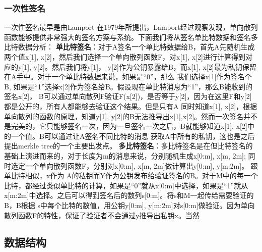 \subsubsection{一次性签名}
一次性签名最早是由Lamport \cite{diffie1976new}在1979年所提出，Lamport经过观察发现，单向散列函数能够提供非常强大的签名方案与系统。下面我们将从签名单比特数据和签名多比特数据分析：
\textbf{单比特签名}：对于A签名一个单比特数据给B，首先A先随机生成两个值x[1], x[2]，然后我们选择一个单向散列函数F，对x[1], x[2]进行计算得到对应的y[1], y[2]。然后我们将y[1]， y[2]作为公钥暴露给B，而x[1], x[2]最为私钥保留在A手中。对于一个单比特数据来说，如果是“0”，那么
我们选择x[1]作为签名个B, 如果是“1”选择x[2]作为签名给B。假设现在单比特消息为“1”，那么B能收到的签名x[2]， B可以通过单向散列F验证F(x[2])，是否等于y[2]，因为在这里F和y[2]都是公开的，所有人都能够去验证这个结果。但是只有A
同时知道x[1], x[2]，根据单向散列的函数的原理，知道y[1], y[2]的B无法推导出x[1],x[2]。然而一次签名并不是完美的，它只能够签名一次，因为一旦签名一次之后，B就能够知道x[1], x[2]中的一个值。B可以通过让A签名不同比特的消息
获取A中所有的私钥，这也是之后提出merkle tree的一个主要出发点。
\textbf{多比特签名}：多比特签名是在但比特签名的基础上演进而来的，对于长度为m的消息来说，分别随机生成x[0:m], x[m, 2m]; 同时选定一个单向散列函数F，分别对x[0:m], x[m, 2m]做计算出y[0:m], y[m:2m]。 跟单比特相似，x作为
A的私钥而Y作为公钥发布给验证签名的B。对于M中的每一个比特，都经过类似单比特的计算，如果是“0”就从x[0:m]中选择，如果是“1”就从x[m:2m]中选择。之后可以得到签名后的数列s[0:m]。将s和M一起传给需要验证的B，B根据
s中每个比特的数值，用公钥y[0:m], y[m:2m]对s[0:m]做验证。因为单向散列函数F的特性，保证了验证者不会通过y推导出私钥x。当然



\subsection{数据结构}

